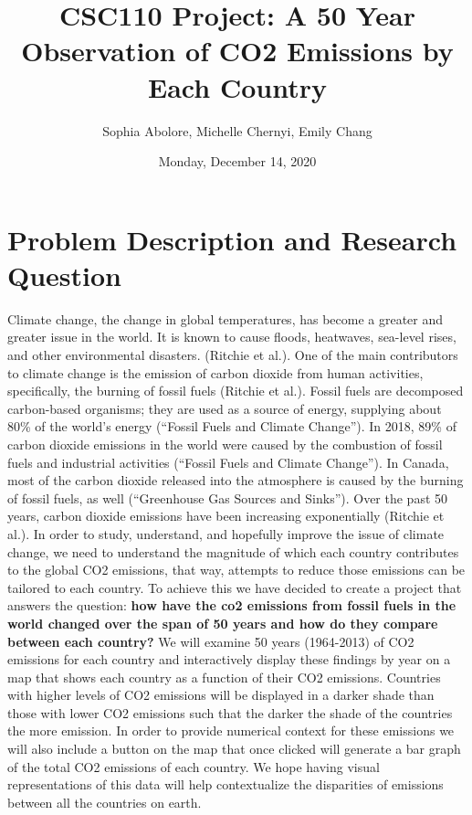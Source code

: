 \documentclass[fontsize=11pt]{article}
\title{CSC110 Project: A 50 Year Observation of CO2 Emissions by Each Country}
\author{Sophia Abolore, Michelle Chernyi, Emily Chang}
\date{Monday, December 14, 2020}
\begin{document}
\maketitle

\section*{Problem Description and Research Question}

Climate change, the change in global temperatures, has become a greater and greater issue in the world. It is known to cause floods, heatwaves, sea-level rises, and other environmental disasters. (Ritchie et al.). One of the main contributors to climate change is the emission of carbon dioxide from human activities, specifically, the burning of fossil fuels (Ritchie et al.). Fossil fuels are decomposed carbon-based organisms; they are used as a source of energy, supplying about 80\% of the world's energy (“Fossil Fuels and Climate Change”). In 2018, 89\% of carbon dioxide emissions in the world were caused by the combustion of fossil fuels and industrial activities (“Fossil Fuels and Climate Change”). In Canada, most of the carbon dioxide released into the atmosphere is caused by the burning of fossil fuels, as well (“Greenhouse Gas Sources and Sinks”). Over the past 50 years, carbon dioxide emissions have been increasing exponentially (Ritchie et al.).  In order to study, understand, and hopefully improve the issue of climate change, we need to understand the magnitude of which each country contributes to the global CO2 emissions, that way, attempts to reduce those emissions can be tailored to each country. To achieve this we have decided to create a project that answers the question: \textbf{how have the co2 emissions from fossil fuels in the world changed over the span of 50 years and how do they compare between each country?} We will examine 50 years (1964-2013) of CO2 emissions for each country and interactively display these findings by year on a map that shows each country as a function of their CO2 emissions. Countries with higher levels of CO2 emissions will be displayed in a darker shade than those with lower CO2 emissions such that the darker the shade of the countries the more emission. In order to provide numerical context for these emissions we will also include a button on the map that once clicked will generate a bar graph of the total CO2 emissions of each country. We hope having visual representations of this data will help contextualize the disparities of emissions between all the countries on earth. 
\end{document}
